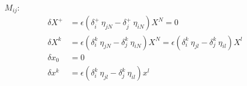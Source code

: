 \begin{itemize}
\item[$M_{ij}$:]
	\begin{align*}
	\delta X^+ &= \epsilon(\delta^+_i\:\eta_{jN} - \delta^+_j\:\eta_{iN}) X^N = 0 \\
	\delta X^k &= \epsilon(\delta^k_i\:\eta_{jN} - \delta^k_j\:\eta_{iN}) X^N = \epsilon(\delta^k_i\:\eta_{jl} - \delta^k_j\:\eta_{il}) X^l \\
	\delta x_0 &= 0 \\
	\delta x^k &= \epsilon(\delta^k_i\:\eta_{jl} - \delta^k_j\:\eta_{il}) x^l
	\end{align*}
\end{itemize}


